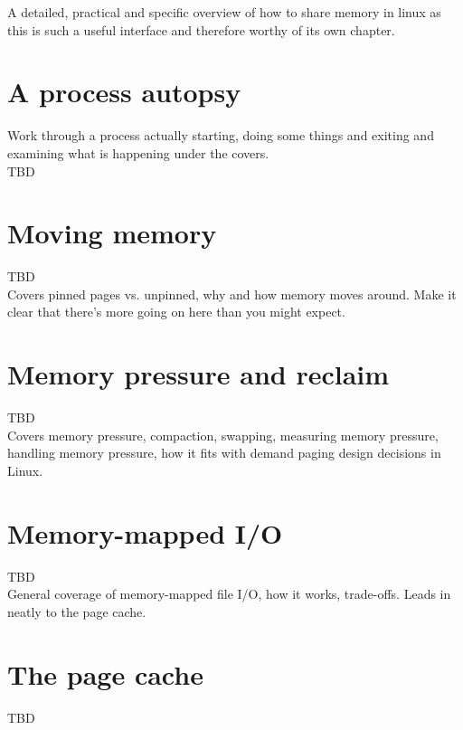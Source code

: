 \documentclass[a4paper,oneside]{scrbook}
\begin{document}
A detailed, practical and specific overview of how to share memory in linux as
this is such a useful interface and therefore worthy of its own chapter.\\

\chapter{A process autopsy}

Work through a process actually starting, doing some things and exiting and
examining what is happening under the covers.\\

TBD\\

\chapter{Moving memory}

TBD\\

Covers pinned pages vs. unpinned, why and how memory moves around. Make it clear
that there's more going on here than you might expect.\\

\chapter{Memory pressure and reclaim}

TBD\\

Covers memory pressure, compaction, swapping, measuring memory pressure,
handling memory pressure, how it fits with demand paging design decisions in
Linux.\\


\chapter{Memory-mapped I/O}

TBD\\

General coverage of memory-mapped file I/O, how it works, trade-offs. Leads in
neatly to the page cache.

\chapter{The page cache}

TBD\\
\end{document}
